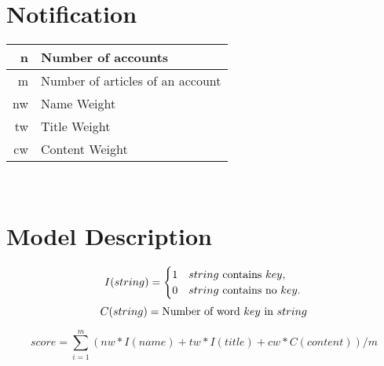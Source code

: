 \documentclass{article}
\begin{document}
\section{Notification}
\begin{tabular}{|r|l|}
\hline
n & Number of accounts\\
\hline
m & Number of articles of an account\\
\hline
nw & Name Weight\\
\hline
tw & Title Weight\\
\hline
cw & Content Weight\\
\hline
\end{tabular} \\ 

\section{Model Description}
\begin{equation}
I(string)=\begin{cases}
1 & \text{$string$ contains $key$},\\
0 & \text{$string$ contains no $key$}.
\end{cases}\\
\end{equation}
\begin{equation}
C(string)=\text{Number of word $key$ in $string$}\\
\end{equation}

\begin{equation}
score=\sum_{i=1}^{m} (nw*I(name)+tw*I(title)+cw*C(content)) / m 
\end{equation}
\end{document}
